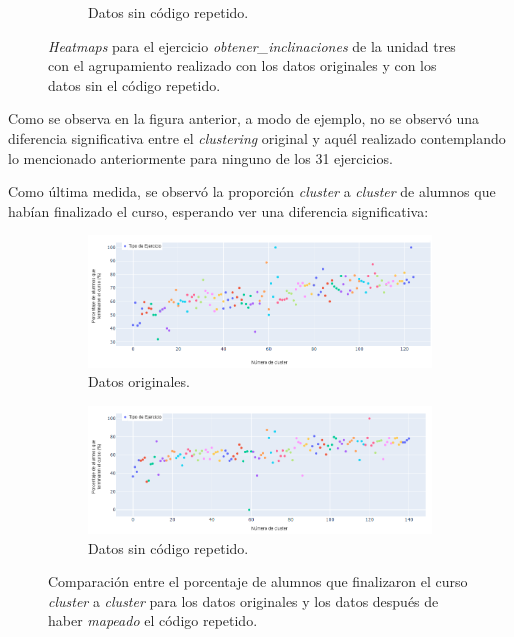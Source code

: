 \documentclass[11pt,a4paper,twoside,openany]{tesis}
\begin{document}
\begin{figure}[H]
\begin{subfigure}{0.45\textwidth}
        \caption{Datos sin código repetido.}
        \label{fig:figura4}
    \end{subfigure}
    \caption{\emph{Heatmaps} para el ejercicio \emph{obtener\_inclinaciones} de la unidad tres con el agrupamiento realizado con los datos originales y con los datos sin el código repetido.}
    \label{fig:figuras_juntas}
\end{figure}

Como se observa en la figura anterior, a modo de ejemplo, no se observó una diferencia significativa entre el \emph{clustering} original y aquél realizado contemplando lo mencionado anteriormente para ninguno de los 31 ejercicios.

Como última medida, se observó la proporción \emph{cluster} a \emph{cluster} de alumnos que habían finalizado el curso, esperando ver una diferencia significativa:

\begin{figure}[H]
    \centering
    \begin{subfigure}{0.45\textwidth}
        \includegraphics[width=\linewidth]{imagenes/porcentaje - original.png}
        \caption{Datos originales.}
        \label{fig:figura5}
    \end{subfigure}
    \hfill
    \begin{subfigure}{0.45\textwidth}
        \includegraphics[width=\linewidth]{imagenes/porcentaje - unniques.png}
        \caption{Datos sin código repetido.}
        \label{fig:figura6}
    \end{subfigure}
    \caption{Comparación entre el porcentaje de alumnos que finalizaron el curso \emph{cluster} a \emph{cluster} para los datos originales y los datos después de haber \emph{mapeado} el código repetido.}
    \label{porcentajes}
\end{figure}
\end{document}

